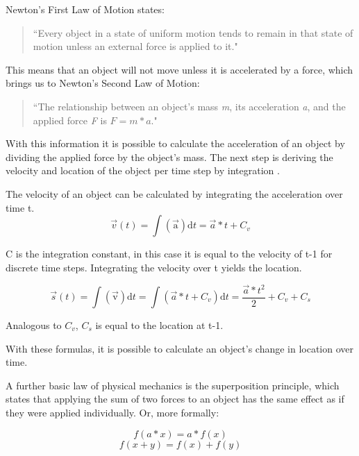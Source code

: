 \documentclass[runningheads,a4paper]{llncs}
\begin{document}
Newton's First Law of Motion states:
\begin{quotation}
``Every object in a state of uniform motion tends to remain in that state of motion unless an external force is applied to it." \cite{Newton}
\end{quotation}

This means that an object will not move unless it is accelerated by a force, which brings us to Newton's Second Law of Motion:
\begin{quotation}
``The relationship between an object's mass \emph{m}, its acceleration \emph{a}, and the applied force \emph{F} is $ F = m*a $."  \cite{Newton}
\end{quotation}

With this information it is possible to calculate the acceleration of an object by dividing the applied force by the object's mass. The next step is deriving the velocity and location of the object per time step by integration \cite{strommer}.

The velocity of an object can be calculated by integrating the acceleration over time t. 
\begin{equation}
\overrightarrow{v}(t) = \int \mathrm{(\overrightarrow{a})} \mathrm{d}t = \overrightarrow{a}*t + C_v
\label{eq:vel}
\end{equation}

C is the integration constant, in this case it is equal to the velocity of t-1 for discrete time steps. Integrating the velocity over t yields the location.

\begin{equation}
\overrightarrow{s}(t) = \int \mathrm{(\overrightarrow{v})} \mathrm{d}t = \int (\overrightarrow{a}*t + C_v) \mathrm{d}t = \frac{\overrightarrow{a}*t^2}{2} + C_v + C_s
\label{eq:loc}
\end{equation}

Analogous to $C_v$, $C_s$ is equal to the location at t-1.

With these formulas, it is possible to calculate an object's change in location over time.

A further basic law of physical mechanics is the superposition principle, which states that applying the sum of two forces to an object has the same effect as if they were applied individually. Or, more formally:

\begin{equation}
f(a * x) = a * f(x)
\label{eq:superpos1}
\end{equation}
\begin{equation}
f(x + y) = f(x) + f(y)
\label{eq:superpos2}
\end{equation}
\end{document}
